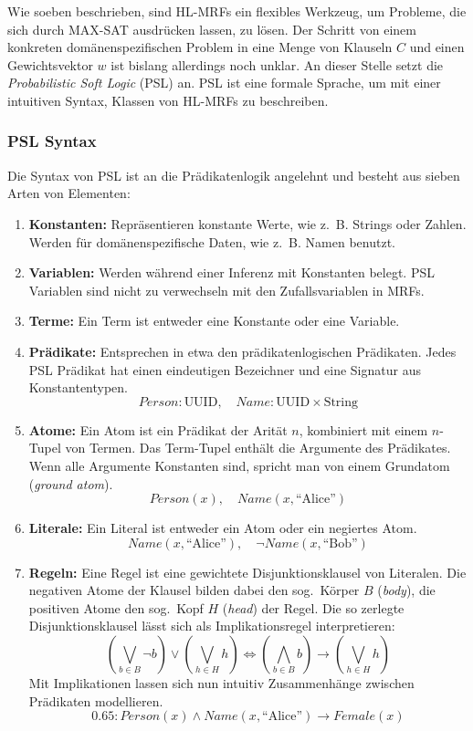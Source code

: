 Wie soeben beschrieben, sind HL-MRFs ein flexibles Werkzeug, um Probleme, die sich durch MAX-SAT ausdrücken lassen, zu lösen.
Der Schritt von einem konkreten domänenspezifischen Problem in eine Menge von Klauseln $C$ und einen Gewichtsvektor $w$ ist bislang allerdings noch unklar.
An dieser Stelle setzt die \textit{Probabilistic Soft Logic} (PSL) an.
PSL ist eine formale Sprache, um mit einer intuitiven Syntax, Klassen von HL-MRFs zu beschreiben.

\subsubsection{PSL Syntax}
Die Syntax von PSL ist an die Prädikatenlogik angelehnt und besteht aus sieben Arten von Elementen:
\begin{enumerate}
	\item \textbf{Konstanten:}
		Repräsentieren konstante Werte, wie z.~B. Strings oder Zahlen.
		Werden für domänenspezifische Daten, wie z.~B. Namen benutzt.
	\item \textbf{Variablen:}
		Werden während einer Inferenz mit Konstanten belegt.
		PSL Variablen sind nicht zu verwechseln mit den Zufallsvariablen in MRFs.
	\item \textbf{Terme:}
		Ein Term ist entweder eine Konstante oder eine Variable.
	\item \textbf{Prädikate:}
		Entsprechen in etwa den prädikatenlogischen Prädikaten.
		Jedes PSL Prädikat hat einen eindeutigen Bezeichner und eine Signatur aus Konstantentypen.
		\[Person: \text{UUID},\quad Name: \text{UUID} \times \text{String}\]
	\item \textbf{Atome:}
		Ein Atom ist ein Prädikat der Arität $n$, kombiniert mit einem $n$-Tupel von Termen.
		Das Term-Tupel enthält die Argumente des Prädikates.
		Wenn alle Argumente Konstanten sind, spricht man von einem Grundatom (\textit{ground atom}). \\
		\[Person(x),\quad Name(x, \text{``Alice''})\] %
	\item \textbf{Literale:}
		Ein Literal ist entweder ein Atom oder ein negiertes Atom. \\
		\[Name(x, \text{``Alice''}),\quad \lnot Name(x, \text{``Bob''})\] %
	\item \textbf{Regeln:}
		Eine Regel ist eine gewichtete Disjunktionsklausel von Literalen.
		Die negativen Atome der Klausel bilden dabei den sog.\ Körper $B$ (\textit{body}), die positiven Atome den sog.\ Kopf $H$ (\textit{head}) der Regel.
		Die so zerlegte Disjunktionsklausel lässt sich als Implikationsregel interpretieren:
		\[
			\left(\bigvee_{b \in B} \lnot b\right) \lor \left(\bigvee_{h \in H} h\right) \Leftrightarrow \left(\bigwedge_{b \in B}  b\right) \rightarrow \left(\bigvee_{h \in H} h\right)
		\]
		Mit Implikationen lassen sich nun intuitiv Zusammenhänge zwischen Prädikaten modellieren.\\
		\[0.65: Person(x) \land Name(x, \text{``Alice''}) \rightarrow Female(x)\] %
\end{enumerate}

